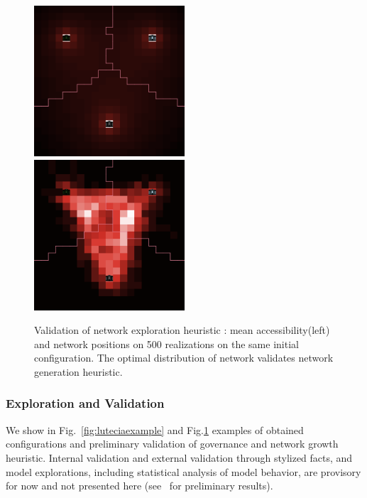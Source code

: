 \begin{figure}
\includegraphics[width=0.5\textwidth]{Figures/PartII/Modeling/Lutecia/_MEAN_ACC}
\includegraphics[width=0.5\textwidth]{Figures/PartII/Modeling/Lutecia/_NW_FREQ}
\caption[Validation of network exploration heuristic]{Validation of network exploration heuristic : mean accessibility(left) and network positions on 500 realizations on the same initial configuration. The optimal distribution of network validates network generation heuristic.}
\label{fig:luteciavalid}
\end{figure}



\subsubsection{Exploration and Validation}

We show in Fig.~\ref{fig:luteciaexample} and Fig.\ref{fig:luteciavalid} examples of obtained configurations and preliminary validation of governance and network growth heuristic. Internal validation and external validation through stylized facts, and model explorations, including statistical analysis of model behavior, are provisory for now and not presented here (see~\cite{le2015modeling} for preliminary results).











